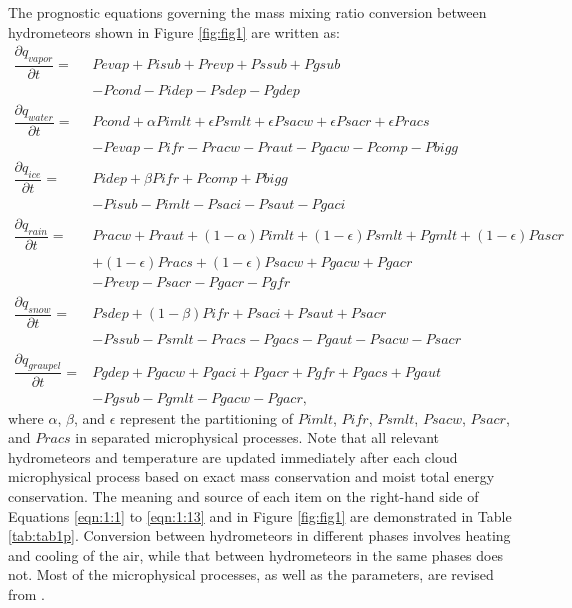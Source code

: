 \documentclass[letterpaper,titlepage,10pt]{article}
\numberwithin{equation}{section}
\begin{document}
The prognostic equations governing the mass mixing ratio conversion between hydrometeors shown in Figure \ref{fig:fig1} are written as:
\begin{align}
	\dfrac{\partial q_{vapor}}{\partial t} = & Pevap + Pisub + Prevp + Pssub + Pgsub \nonumber \\ & - Pcond - Pidep - Psdep - Pgdep \label{eqn:1:1}\\
	\dfrac{\partial q_{water}}{\partial t} = & Pcond + \alpha Pimlt + \epsilon Psmlt + \epsilon Psacw + \epsilon Psacr + \epsilon Pracs \nonumber \\ & - Pevap - Pifr - Pracw - Praut - Pgacw - Pcomp - Pbigg \\
	\dfrac{\partial q_{ice}}{\partial t} = & Pidep + \beta Pifr + Pcomp + Pbigg \nonumber \\ & - Pisub - Pimlt - Psaci - Psaut - Pgaci \\
	\dfrac{\partial q_{rain}}{\partial t} = & Pracw + Praut + (1 - \alpha) Pimlt + (1 - \epsilon) Psmlt + Pgmlt  + (1 - \epsilon) Pascr \nonumber \\ & + (1 - \epsilon) Pracs + (1 - \epsilon) Psacw + Pgacw + Pgacr \nonumber \\ & - Prevp - Psacr - Pgacr - Pgfr \\
	\dfrac{\partial q_{snow}}{\partial t} = & Psdep + (1 - \beta) Pifr + Psaci + Psaut + Psacr \nonumber \\ & - Pssub - Psmlt - Pracs - Pgacs - Pgaut - Psacw - Psacr \\
	\dfrac{\partial q_{graupel}}{\partial t} = & Pgdep + Pgacw + Pgaci + Pgacr + Pgfr + Pgacs + Pgaut \nonumber \\ & - Pgsub - Pgmlt - Pgacw - Pgacr \label{eqn:1:13},
\end{align}
where $\alpha$, $\beta$, and $\epsilon$ represent the partitioning of $Pimlt$, $Pifr$, $Psmlt$, $Psacw$, $Psacr$, and $Pracs$ in separated microphysical processes. Note that all relevant hydrometeors and temperature are updated immediately after each cloud microphysical process based on exact mass conservation and moist total energy conservation. The meaning and source of each item on the right-hand side of Equations \eqref{eqn:1:1} to \eqref{eqn:1:13} and in Figure \ref{fig:fig1} are demonstrated in Table \ref{tab:tab1p}. Conversion between hydrometeors in different phases involves heating and cooling of the air, while that between hydrometeors in the same phases does not. Most of the microphysical processes, as well as the parameters, are revised from \citet{lin1983bulk, hong2004arev, hong2006thew}.
\end{document}

